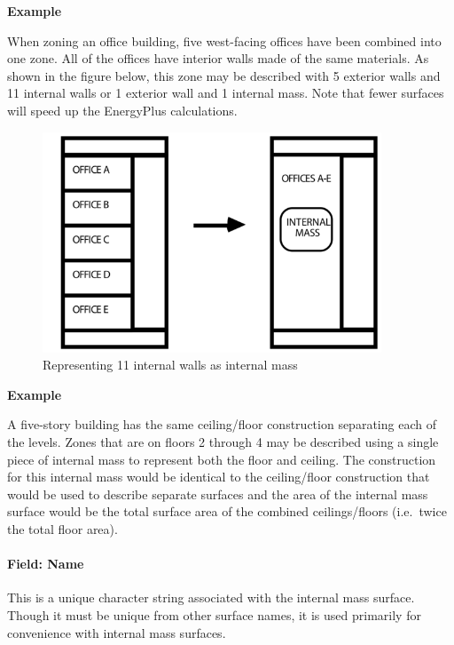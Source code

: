 \textbf{Example}

When zoning an office building, five west-facing offices have been combined into one zone. All of the offices have interior walls made of the same materials. As shown in the figure below, this zone may be described with 5 exterior walls and 11 internal walls or 1 exterior wall and 1 internal mass. Note that fewer surfaces will speed up the EnergyPlus calculations.

\begin{figure}[hbtp] %
\centering
\includegraphics[width=0.9\textwidth, height=0.9\textheight, keepaspectratio=true]{media/image056.png}
\caption{Representing 11 internal walls as internal mass \protect \label{fig:representing-11-internal-walls-as-internal}}
\end{figure}

\textbf{Example}

A five-story building has the same ceiling/floor construction separating each of the levels. Zones that are on floors 2 through 4 may be described using a single piece of internal mass to represent both the floor and ceiling. The construction for this internal mass would be identical to the ceiling/floor construction that would be used to describe separate surfaces and the area of the internal mass surface would be the total surface area of the combined ceilings/floors (i.e.~twice the total floor area).

\paragraph{Field: Name}\label{field-name-21-004}

This is a unique character string associated with the internal mass surface. Though it must be unique from other surface names, it is used primarily for convenience with internal mass surfaces.


